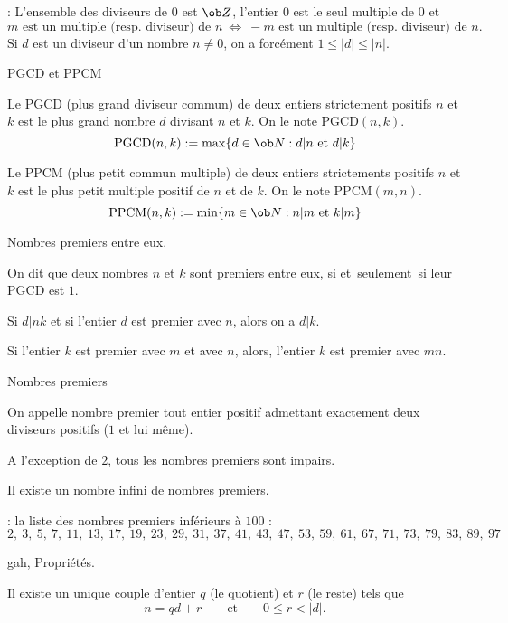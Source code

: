 \Remarque : L'ensemble des diviseurs de $0$ est $\ob Z$, l'entier $0$ est le seul multiple de $0$ et 
$$
m \mbox{ est un multiple (resp. diviseur) de }n\ \Longleftrightarrow\ -m \mbox{ est un multiple (resp. diviseur) de }n.
$$ 
Si $d$ est un diviseur d'un nombre $n\neq0$, on a forc\'ement $1\le |d|\le |n|$. 
\bigskip

\Concept [] PGCD et PPCM

\Definition []  Le PGCD (plus grand diviseur commun) de deux entiers strictement positifs $n$ et $k$ est le plus grand nombre $d$ divisant $n$ et $k$. On le note 
$\mbox{PGCD}(n,k)$. 
$$
\mbox{PGCD}(n,k):=\max\{d\in\ob N:d|n\mbox{ et }d|k\}
$$ 

\Definition []  Le PPCM (plus petit commun multiple) de deux entiers strictements positifs $n$ et $k$ est le plus petit multiple positif de $n$ et de $k$. 
On le note $\mbox{PPCM}(m,n)$. 
$$
\mbox{PPCM}(n,k):=\min\{m\in\ob N:n|m\mbox{ et }k|m\}
$$ 

\Concept [] Nombres premiers entre eux. 

\Definition []  On dit que deux nombres $n$ et $k$ sont premiers entre eux, si et~seulement~si leur PGCD est $1$. 
\bigskip

\Theoreme [Title=Th\'eor\`eme de Gauss;$n$ et $k$ deux entiers strictements positifs]
Si $d|nk$ et si l'entier $d$ est premier avec $n$, alors on a $d|k$. 
\bigskip
  
\Propriete []  Si l'entier $k$ est premier avec $m$ et avec $n$, alors, l'entier $k$ est premier avec $mn$. 
\bigskip


\Concept [] Nombres premiers

\Definition []  On appelle nombre premier tout entier positif admettant exactement deux diviseurs positifs ($1$ et lui m\^eme).
\bigskip

\Propriete []  A l'exception de $2$, tous les nombres premiers sont impairs. 
\bigskip
 
\Propriete []  Il existe un nombre infini de nombres premiers. 
\bigskip

\Remarque : la liste des nombres premiers inf\'erieurs \`a $100$ : 
$$
2,\ 3,\ 5,\ 7,\ 11,\ 13,\ 17,\ \!19,\ 23,\ 29,\ 31, \ 37, \ \!41,\ 43, \ 47,\ \!53, \ 59,\ 61,\ 67,\ 71,\ 73,\ 79,\ 83,\ 89,\ \!97
$$

\Subsection gah, Propri\'et\'es.

\Theoreme [$n\in\ob Z$ et $d\in\ob Z^*$;Title=Division euclidienne] 
Il existe un unique couple d'entier $q$ (le quotient) et $r$ (le reste) tels que 
$$
n=qd+r\qquad \mbox{et}\qquad 0\le r<|d|.
$$

